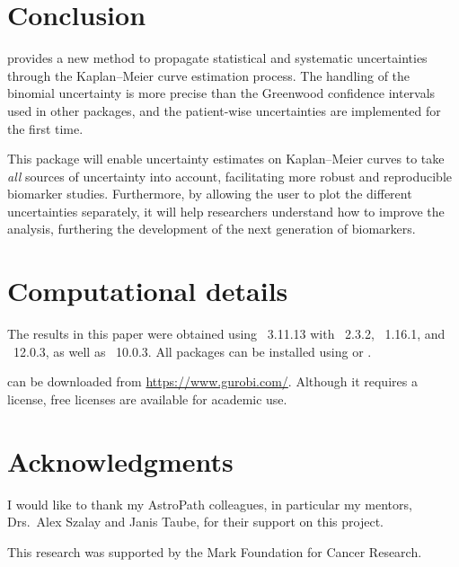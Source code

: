 \documentclass[article]{jss}
\newcommand{\KM}{Kaplan--Meier} %
\begin{document}
\section{Conclusion}

 provides a new method to propagate statistical and systematic uncertainties through the \KM{} curve estimation process.  The handling of the binomial uncertainty is more precise than the Greenwood confidence intervals used in other packages, and the patient-wise uncertainties are implemented for the first time.

This package will enable uncertainty estimates on \KM{} curves to take \emph{all} sources of uncertainty into account, facilitating more robust and reproducible biomarker studies.  Furthermore, by allowing the user to plot the different uncertainties separately, it will help researchers understand how to improve the analysis, furthering the development of the next generation of biomarkers.

\section*{Computational details}

The results in this paper were obtained using ~3.11.13 with ~2.3.2, ~1.16.1, and ~12.0.3, as well as ~10.0.3.  All  packages can be installed using  or .

 can be downloaded from \url{https://www.gurobi.com/}.  Although it requires a license, free licenses are available for academic use.

\section*{Acknowledgments}

I would like to thank my AstroPath colleagues, in particular my mentors, Drs.~Alex Szalay and Janis Taube, for their support on this project.

This research was supported by the Mark Foundation for Cancer Research.

\end{document}
